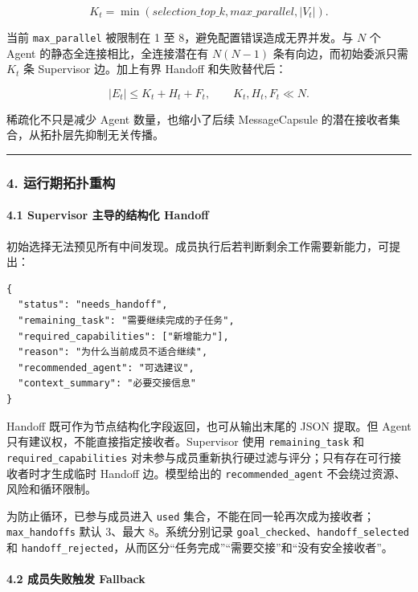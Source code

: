 \documentclass[UTF8,a4paper,12pt]{ctexart}
\begin{document}
\[
K_t=\min(selection\_top\_k,max\_parallel,|V_t|).
\]

当前 \texttt{max\_parallel} 被限制在 1 至 8，避免配置错误造成无界并发。与 \(N\) 个 Agent 的静态全连接相比，全连接潜在有 \(N(N-1)\) 条有向边，而初始委派只需 \(K_t\) 条 Supervisor 边。加上有界 Handoff 和失败替代后：

\[
|E_t|\le K_t+H_t+F_t,\qquad K_t,H_t,F_t\ll N.
\]

稀疏化不只是减少 Agent 数量，也缩小了后续 MessageCapsule 的潜在接收者集合，从拓扑层先抑制无关传播。

\begin{center}\rule{0.5\linewidth}{0.5pt}\end{center}

\subsubsection{4. 运行期拓扑重构}

\paragraph{4.1 Supervisor 主导的结构化 Handoff}

初始选择无法预见所有中间发现。成员执行后若判断剩余工作需要新能力，可提出：

\begin{verbatim}
{
  "status": "needs_handoff",
  "remaining_task": "需要继续完成的子任务",
  "required_capabilities": ["新增能力"],
  "reason": "为什么当前成员不适合继续",
  "recommended_agent": "可选建议",
  "context_summary": "必要交接信息"
}
\end{verbatim}

Handoff 既可作为节点结构化字段返回，也可从输出末尾的 JSON 提取。但 Agent 只有建议权，不能直接指定接收者。Supervisor 使用 \texttt{remaining\_task} 和 \texttt{required\_capabilities} 对未参与成员重新执行硬过滤与评分；只有存在可行接收者时才生成临时 Handoff 边。模型给出的 \texttt{recommended\_agent} 不会绕过资源、风险和循环限制。

为防止循环，已参与成员进入 \texttt{used} 集合，不能在同一轮再次成为接收者；\texttt{max\_handoffs} 默认 3、最大 8。系统分别记录 \texttt{goal\_checked}、\texttt{handoff\_selected} 和 \texttt{handoff\_rejected}，从而区分``任务完成''``需要交接''和``没有安全接收者''。

\paragraph{4.2 成员失败触发 Fallback}
\end{document}
